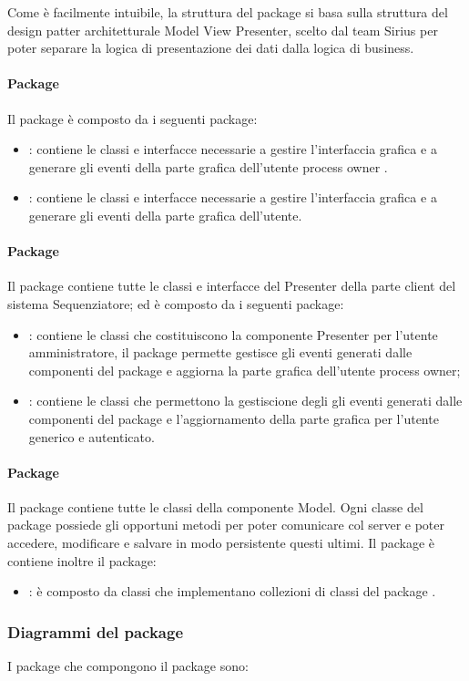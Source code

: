 Come è facilmente intuibile, la struttura del package \client{} si basa sulla struttura del design patter
architetturale Model View Presenter, scelto dal team Sirius per poter separare la logica di presentazione dei dati dalla logica di business.\\

\paragraph{Package \view{}}
Il package \view{} è composto da i seguenti package:
\begin{itemize}
	\item \viewAdmin{}: contiene le classi e interfacce necessarie a gestire 
l’interfaccia grafica e a generare gli eventi della parte grafica dell'utente process owner .
	\item \viewUser{}: contiene le classi e interfacce necessarie a gestire l’interfaccia
grafica e a generare gli eventi della parte grafica dell’utente.
\end{itemize}
\paragraph{Package \logic{}}
Il package \logic{} contiene tutte le classi e interfacce del Presenter della 
parte client del sistema Sequenziatore; ed è composto da i seguenti package:
\begin{itemize}
	\item \logicAdmin{}: contiene le classi che costituiscono la componente Presenter
per l’utente amministratore, il package \logicAdmin{} permette gestisce gli eventi generati dalle componenti del package \viewAdmin{} e 
aggiorna la parte grafica dell'utente process owner;
	\item \logicUser{}: contiene le classi che permettono la gestiscione degli gli eventi generati dalle componenti del package
\viewUser{} e l'aggiornamento della parte grafica per l'utente generico e autenticato.
\end{itemize}
\paragraph{Package \model{}}
Il package \model{} contiene tutte le classi della componente Model. Ogni classe del package \model{} possiede gli opportuni metodi per poter
comunicare col server e poter accedere, modificare e salvare in modo persistente questi ultimi.
Il package è contiene inoltre il package:
\begin{itemize}
	\item \collection{}: è composto da classi che implementano collezioni di classi del package \model{}.
\end{itemize} 


\subsubsection{Diagrammi del package \server{}}
I package che compongono il package \server{} sono:
\begin{itemize}
\end{itemize}

